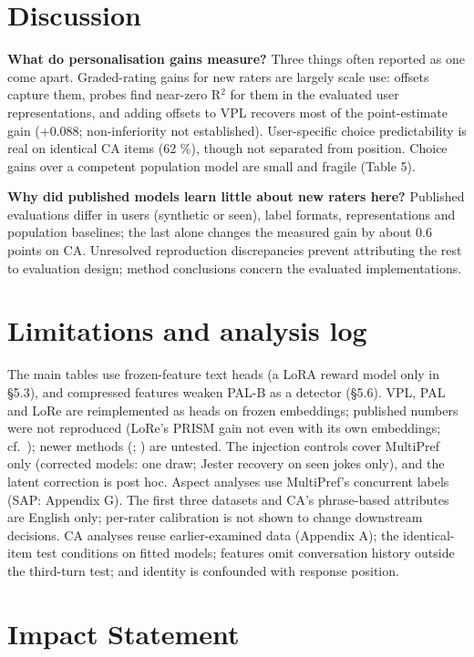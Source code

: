 \documentclass{article}
\begin{document}
\section{Discussion}

\textbf{What do personalisation gains measure?} Three things often reported as one come apart. Graded-rating gains for new raters are largely scale use: offsets capture them, probes find near-zero R$^2$ for them in the evaluated user representations, and adding offsets to VPL recovers most of the point-estimate gain (+0.088; non-inferiority not established). User-specific choice predictability is real on identical CA items (62 \%), though not separated from position. Choice gains over a competent population model are small and fragile (Table 5).

\textbf{Why did published models learn little about new raters here?} Published evaluations differ in users (synthetic or seen), label formats, representations and population baselines; the last alone changes the measured gain by about 0.6 points on CA. Unresolved reproduction discrepancies prevent attributing the rest to evaluation design; method conclusions concern the evaluated implementations.

\section{Limitations and analysis log}

The main tables use frozen-feature text heads (a LoRA reward model only in \S{}5.3), and compressed features weaken PAL-B as a detector (\S{}5.6). VPL, PAL and LoRe are reimplemented as heads on frozen embeddings; published numbers were not reproduced (LoRe's PRISM gain not even with its own embeddings; cf.~\citealp{rezk2025crisis}); newer methods (\citealp{cai2026mrm}; \citealp{zhang2026pgenrm}) are untested. The injection controls cover MultiPref only (corrected models: one draw; Jester recovery on seen jokes only), and the latent correction is post hoc. Aspect analyses use MultiPref's concurrent labels (SAP: Appendix G). The first three datasets and CA's phrase-based attributes are English only; per-rater calibration is not shown to change downstream decisions. CA analyses reuse earlier-examined data (Appendix A); the identical-item test conditions on fitted models; features omit conversation history outside the third-turn test; and identity is confounded with response position.

\section*{Impact Statement}
\end{document}
